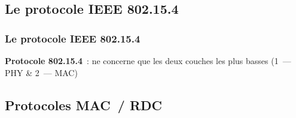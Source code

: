 \documentclass[10pt,c]{beamer}
\newcommand{\nom}[1]{\textbf{#1}}
\begin{document}
\subsection{Le protocole IEEE 802.15.4}

\begin{frame}[label=ieeephys1]
\frametitle{Le protocole IEEE 802.15.4}

\nom{Protocole 802.15.4}~: ne concerne que les deux couches les plus basses
(1~--- PHY \& 2~--- MAC)

\vspace{-0.25cm}

\end{frame}


\subsection{Protocoles MAC~/ RDC}
\end{document}
